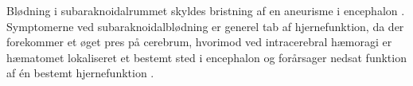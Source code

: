 Blødning i subaraknoidalrummet skyldes bristning af en aneurisme  i encephalon \cite{Schulze2011}. Symptomerne ved subaraknoidalblødning er generel tab af hjernefunktion, da der forekommer et øget pres på cerebrum, hvorimod ved intracerebral hæmoragi er hæmatomet lokaliseret et bestemt sted i encephalon og forårsager nedsat funktion af én bestemt hjernefunktion \cite{Caplan2006}. 

